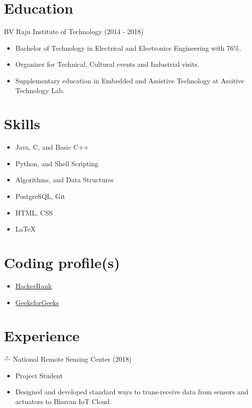 \documentclass{article}
\begin{document}
\begin{multicols}{2}
\section*{Education}
 BV Raju Institute of Technology (2014 - 2018)
\begin{itemize}
\item \small Bachelor of Technology in Electrical and Electronics Engineering with 76\%.
\item \small Organizer for Technical, Cultural events and Industrial visits.
\item \small Supplementary education in Embedded and Assistive Technology  at Assitive Technology Lab.
\end{itemize}

\section*{Skills}
\begin{itemize}
    \item Java, C, and Basic C++
    \item  Python, and Shell Scripting
    \item Algorithms, and Data Structures
    \item PostgreSQL, Git
    \item HTML, CSS
    \item \LaTeX
\end{itemize}

\section*{Coding profile(s)}
\begin{itemize}
\item \href {https://hackerrank.com/rcreddyn}{HackerRank}
\item \href {https://auth.geeksforgeeks.org/user/rcreddyn/}{GeeksforGeeks}
\end{itemize}

\section*{Experience}
\includegraphics[width=14px]{isro.png} National Remote Sensing Center (2018)
\begin{itemize}
\item \small Project Student
\item \small Designed and developed standard ways to trans-receive data from sensors and actuators to  Bhuvan IoT Cloud.
\end{itemize}


\end{multicols}
\end{document}
